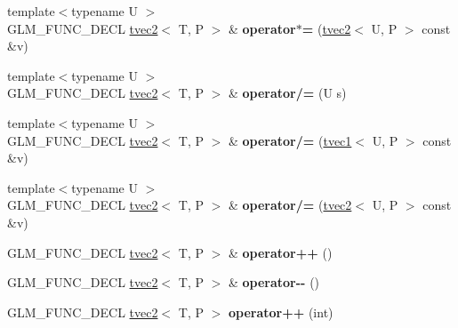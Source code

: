 \begin{DoxyCompactItemize}
\item 
\hypertarget{structglm_1_1tvec2_aa9e3fea6b7122af79c1fa65fc66c1170}{{\footnotesize template$<$typename U $>$ }\\G\-L\-M\-\_\-\-F\-U\-N\-C\-\_\-\-D\-E\-C\-L \hyperlink{structglm_1_1tvec2}{tvec2}$<$ T, P $>$ \& {\bfseries operator$\ast$=} (\hyperlink{structglm_1_1tvec2}{tvec2}$<$ U, P $>$ const \&v)}\label{structglm_1_1tvec2_aa9e3fea6b7122af79c1fa65fc66c1170}

\item 
\hypertarget{structglm_1_1tvec2_af02bb2db6f23af19ef3d6e0b33a05f3f}{{\footnotesize template$<$typename U $>$ }\\G\-L\-M\-\_\-\-F\-U\-N\-C\-\_\-\-D\-E\-C\-L \hyperlink{structglm_1_1tvec2}{tvec2}$<$ T, P $>$ \& {\bfseries operator/=} (U s)}\label{structglm_1_1tvec2_af02bb2db6f23af19ef3d6e0b33a05f3f}

\item 
\hypertarget{structglm_1_1tvec2_a4e8369479212934e679d59357f82db7b}{{\footnotesize template$<$typename U $>$ }\\G\-L\-M\-\_\-\-F\-U\-N\-C\-\_\-\-D\-E\-C\-L \hyperlink{structglm_1_1tvec2}{tvec2}$<$ T, P $>$ \& {\bfseries operator/=} (\hyperlink{structglm_1_1tvec1}{tvec1}$<$ U, P $>$ const \&v)}\label{structglm_1_1tvec2_a4e8369479212934e679d59357f82db7b}

\item 
\hypertarget{structglm_1_1tvec2_a42e14ad86fc32cc36ba3a512cd638585}{{\footnotesize template$<$typename U $>$ }\\G\-L\-M\-\_\-\-F\-U\-N\-C\-\_\-\-D\-E\-C\-L \hyperlink{structglm_1_1tvec2}{tvec2}$<$ T, P $>$ \& {\bfseries operator/=} (\hyperlink{structglm_1_1tvec2}{tvec2}$<$ U, P $>$ const \&v)}\label{structglm_1_1tvec2_a42e14ad86fc32cc36ba3a512cd638585}

\item 
\hypertarget{structglm_1_1tvec2_a1fecc23e8dbc643ad0c42bf20af772b6}{G\-L\-M\-\_\-\-F\-U\-N\-C\-\_\-\-D\-E\-C\-L \hyperlink{structglm_1_1tvec2}{tvec2}$<$ T, P $>$ \& {\bfseries operator++} ()}\label{structglm_1_1tvec2_a1fecc23e8dbc643ad0c42bf20af772b6}

\item 
\hypertarget{structglm_1_1tvec2_a3cd64ee9fc31f7079177a47066804ac7}{G\-L\-M\-\_\-\-F\-U\-N\-C\-\_\-\-D\-E\-C\-L \hyperlink{structglm_1_1tvec2}{tvec2}$<$ T, P $>$ \& {\bfseries operator-\/-\/} ()}\label{structglm_1_1tvec2_a3cd64ee9fc31f7079177a47066804ac7}

\item 
\hypertarget{structglm_1_1tvec2_abcf7247393a639af19c21e70c6a30c1c}{G\-L\-M\-\_\-\-F\-U\-N\-C\-\_\-\-D\-E\-C\-L \hyperlink{structglm_1_1tvec2}{tvec2}$<$ T, P $>$ {\bfseries operator++} (int)}\label{structglm_1_1tvec2_abcf7247393a639af19c21e70c6a30c1c}


\end{DoxyCompactItemize}
